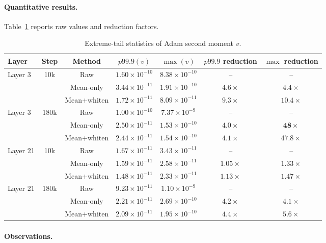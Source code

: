 \paragraph{Quantitative results.}

Table~\ref{tab:adam_v_detailed} reports raw values and reduction factors.

\begin{table}[t]
\centering
\caption{Extreme-tail statistics of Adam second moment $v$.}
\label{tab:adam_v_detailed}
\begin{tabular}{lcccccc}
\toprule
Layer & Step & Method & $p99.9(v)$ & $\max(v)$ &
$p99.9$ reduction & $\max$ reduction \\
\midrule
\multirow{3}{*}{Layer 3}
& 10k
& Raw
& $1.60\times10^{-10}$ & $8.38\times10^{-10}$ & -- & -- \\
& 
& Mean-only
& $3.44\times10^{-11}$ & $1.91\times10^{-10}$ &
$\mathbf{4.6\times}$ & $\mathbf{4.4\times}$ \\
&
& Mean+whiten
& $1.72\times10^{-11}$ & $8.09\times10^{-11}$ &
$9.3\times$ & $10.4\times$ \\
\midrule
\multirow{3}{*}{Layer 3}
& 180k
& Raw
& $1.00\times10^{-10}$ & $7.37\times10^{-9}$ & -- & -- \\
&
& Mean-only
& $2.50\times10^{-11}$ & $1.53\times10^{-10}$ &
$\mathbf{4.0\times}$ & $\mathbf{48\times}$ \\
&
& Mean+whiten
& $2.44\times10^{-11}$ & $1.54\times10^{-10}$ &
$4.1\times$ & $47.8\times$ \\
\midrule
\multirow{3}{*}{Layer 21}
& 10k
& Raw
& $1.67\times10^{-11}$ & $3.43\times10^{-11}$ & -- & -- \\
&
& Mean-only
& $1.59\times10^{-11}$ & $2.58\times10^{-11}$ &
$1.05\times$ & $1.33\times$ \\
&
& Mean+whiten
& $1.48\times10^{-11}$ & $2.33\times10^{-11}$ &
$1.13\times$ & $1.47\times$ \\
\midrule
\multirow{3}{*}{Layer 21}
& 180k
& Raw
& $9.23\times10^{-11}$ & $1.10\times10^{-9}$ & -- & -- \\
&
& Mean-only
& $2.21\times10^{-11}$ & $2.69\times10^{-10}$ &
$\mathbf{4.2\times}$ & $\mathbf{4.1\times}$ \\
&
& Mean+whiten
& $2.09\times10^{-11}$ & $1.95\times10^{-10}$ &
$4.4\times$ & $5.6\times$ \\
\bottomrule
\end{tabular}
\end{table}

\paragraph{Observations.}

